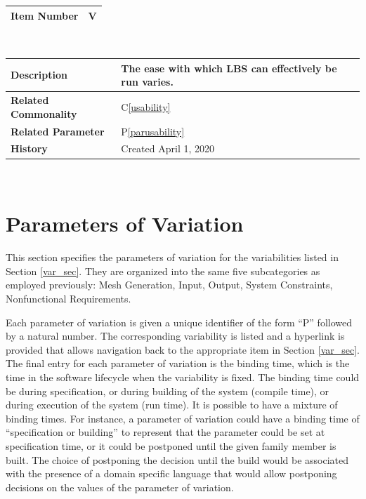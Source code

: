 \documentclass[12pt]{article}
\newcommand{\colCwidth}{0.28\textwidth}
\newcommand{\colDwidth}{0.72\textwidth}
\newcommand{\cref}[1]{C\ref{#1}}
\newcounter{varnum} %
\newcommand{\pref}[1]{P\ref{#1}}
\begin{document}
\noindent
\begin{minipage}{\textwidth}
	\renewcommand*{\arraystretch}{1.5}
	\begin{tabular}{| p{\colCwidth} | p{\colDwidth}|}
		\hline
		\bf Item Number& V{varnum}\thevarnum\label{varusability} \\
		\hline
	\end{tabular}\\
	
	\begin{tabular}{| p{\colCwidth} | p{\colDwidth}|}		
		\hline
		\bf Description & The ease with which LBS can effectively be run varies.\\
		\hline
		\bf Related Commonality & \cref{usability}\\
		\hline
		\bf Related Parameter & \pref{parusability}\\
		\hline
		\bf History & Created April 1, 2020\\
		\hline
	\end{tabular}
\end{minipage}\\
\newpage
\section{Parameters of Variation}
This section specifies the parameters of variation for the variabilities listed in Section \ref{var_sec}. They are organized into the same five subcategories as employed previously: Mesh Generation, Input, Output, System Constraints, Nonfunctional Requirements. 

Each parameter of variation is given a unique identifier of the form “P” followed by a natural number. The corresponding variability is listed and a hyperlink is provided that allows navigation back to the appropriate item in Section \ref{var_sec}. The final entry for each parameter of variation is the binding time, which is the time in the software lifecycle when the variability is fixed. The binding time could be during specification, or during building
of the system (compile time), or during execution of the system (run time). It is possible to have a mixture of binding times. For instance, a parameter of variation could have a binding time of “specification or building” to represent that the parameter could be set at specification time, or it could be postponed until the given family member is built. The choice of postponing the decision until the build would be associated with the presence of a domain specific language that would allow postponing decisions on the values of the parameter of variation.
\end{document}
